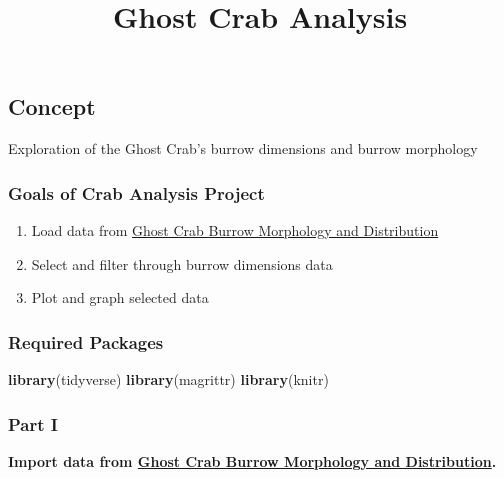 \documentclass[
]{article}
\title{Ghost Crab Analysis}
\author{}
\date{\vspace{-2.5em}}
\newenvironment{Shaded}{\begin{snugshade}}{\end{snugshade}}
\newcommand{\KeywordTok}[1]{\textcolor[rgb]{0.13,0.29,0.53}{\textbf{#1}}}
\newcommand{\NormalTok}[1]{#1}
\providecommand{\tightlist}{%
  \setlength{\itemsep}{0pt}\setlength{\parskip}{0pt}}
\begin{document}
\maketitle

\hypertarget{concept}{%
\subsection{Concept}\label{concept}}

Exploration of the Ghost Crab's burrow dimensions and burrow morphology

\hypertarget{goals-of-crab-analysis-project}{%
\subsubsection{Goals of Crab Analysis
Project}\label{goals-of-crab-analysis-project}}

\begin{enumerate}
\def\labelenumi{\arabic{enumi}.}
\tightlist
\item
  Load data from
  \href{https://doi.org/10.6084/m9.figshare.6895109}{Ghost Crab Burrow
  Morphology and Distribution}
\item
  Select and filter through burrow dimensions data
\item
  Plot and graph selected data
\end{enumerate}

\hypertarget{required-packages}{%
\subsubsection{Required Packages}\label{required-packages}}

\begin{Shaded}
\begin{Highlighting}[]
\KeywordTok{library}\NormalTok{(tidyverse)}
\KeywordTok{library}\NormalTok{(magrittr)}
\KeywordTok{library}\NormalTok{(knitr)}
\end{Highlighting}
\end{Shaded}

\hypertarget{part-i}{%
\subsubsection{Part I}\label{part-i}}

\textbf{Import data from
\href{https://doi.org/10.6084/m9.figshare.6895109}{Ghost Crab Burrow
Morphology and Distribution}.}
\end{document}

